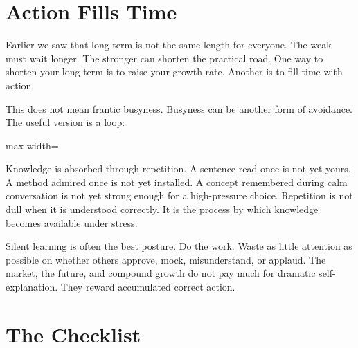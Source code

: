 \section*{Action Fills Time}

Earlier we saw that long term is not the same length for everyone. The weak must wait longer. The stronger can shorten the practical road. One way to shorten your long term is to raise your growth rate. Another is to fill time with action.

This does not mean frantic busyness. Busyness can be another form of avoidance. The useful version is a loop:

\begin{center}
\begin{adjustbox}{max width=\linewidth}
\end{adjustbox}
\end{center}

Knowledge is absorbed through repetition. A sentence read once is not yet yours. A method admired once is not yet installed. A concept remembered during calm conversation is not yet strong enough for a high-pressure choice. Repetition is not dull when it is understood correctly. It is the process by which knowledge becomes available under stress.

Silent learning is often the best posture. Do the work. Waste as little attention as possible on whether others approve, mock, misunderstand, or applaud. The market, the future, and compound growth do not pay much for dramatic self-explanation. They reward accumulated correct action.

\section*{The Checklist}

